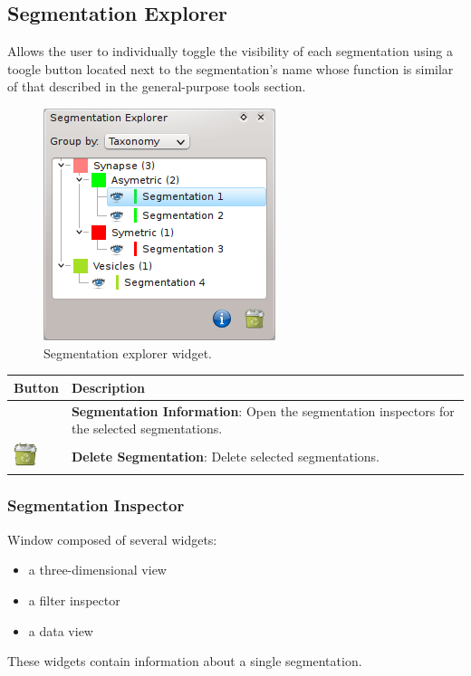 \subsection{Segmentation Explorer}
Allows the user to individually toggle the visibility of each segmentation using a toogle button
located next to the segmentation's name whose function is similar of that described in the
general-purpose tools section.
\begin{figure}[H]
\centering
\includegraphics{fig/SegmentationExplorer}
\caption{Segmentation explorer widget.}
\end{figure}

\begin{tabular}{| m{1.3cm} | m{12cm} |}
\hline
\textbf{Button} & \textbf{Description}\\
\hline
 & %
\textbf{Segmentation Information}: Open the segmentation inspectors for the
selected segmentations.\\
\hline
\includegraphics[width=0.7cm]{../../frontend/rsc/trash-full} &
\textbf{Delete Segmentation}: Delete selected segmentations.\\
\hline
\end{tabular}
\vspace{0.3cm}

\subsubsection{Segmentation Inspector}

Window composed of several widgets:
\begin{itemize}
\item a three-dimensional view
\item a filter inspector 
\item a data view
\end{itemize}
These widgets contain information about a single segmentation.

